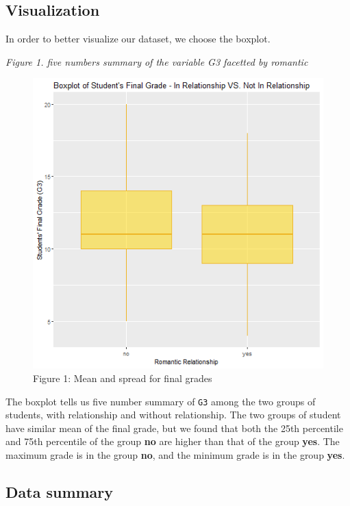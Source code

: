 \documentclass[]{article}
\begin{document}
\subsection{Visualization}\label{visualization}

In order to better visualize our dataset, we choose the boxplot.

\emph{Figure 1. five numbers summary of the variable G3 facetted by
romantic}

\begin{figure}

{\centering \includegraphics[width=6.67in]{../results/boxplot} 

}

\caption{Figure 1: Mean and spread for final grades}\label{fig:unnamed-chunk-3}
\end{figure}

The boxplot tells us five number summary of \texttt{G3} among the two
groups of students, with relationship and without relationship. The two
groups of student have similar mean of the final grade, but we found
that both the 25th percentile and 75th percentile of the group
\textbf{no} are higher than that of the group \textbf{yes}. The maximum
grade is in the group \textbf{no}, and the minimum grade is in the group
\textbf{yes}.

\subsection{Data summary}\label{data-summary}
\end{document}
